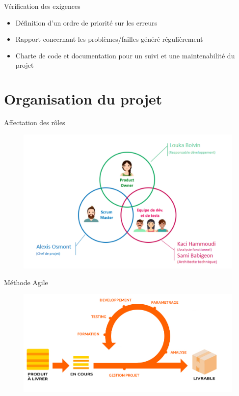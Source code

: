 \documentclass{cubeamer}
\begin{document}
\begin{frame}{Vérification des exigences}
    \begin{itemize}
        \item Définition d'un ordre de priorité sur les erreurs
        \item Rapport concernant les problèmes/failles généré régulièrement
        \item Charte de code et documentation pour un suivi et une maintenabilité du projet
    \end{itemize}
\end{frame}

\section{Organisation du projet} %

\begin{frame}{Affectation des rôles}
    \begin{figure}
        \centering
        \includegraphics[scale=0.18]{img/roles.png}
    \end{figure}
\end{frame}

\begin{frame}{Méthode Agile}
    \begin{figure}
        \centering
        \includegraphics[scale=0.5]{img/methodeagile.png}
    \end{figure}
\end{frame}
\end{document}
